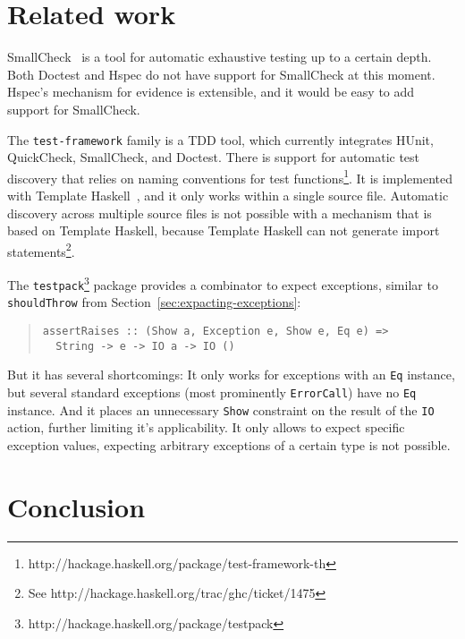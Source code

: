 \documentclass[preprint]{sigplanconf}
\begin{document}
\section{Related work}

SmallCheck~\cite{smallcheck} is a tool for
automatic exhaustive testing up to a certain depth.
Both Doctest and Hspec do not have support for SmallCheck
at this moment.
Hspec's mechanism for evidence is extensible, and it would be easy to
add support for SmallCheck.

The {\tt test-framework} family is a TDD tool, which currently
integrates HUnit, QuickCheck, SmallCheck, and Doctest.
There is support for automatic test discovery that relies on naming
conventions for test functions\footnote{%
http://hackage.haskell.org/package/test-framework-th}.  It is
implemented with Template Haskell~\cite{template-haskell}, and it only
works within a single source file.  Automatic discovery across
multiple source files is not possible with a mechanism that is based
on Template Haskell, because Template Haskell can not generate import
statements\footnote{%
See http://hackage.haskell.org/trac/ghc/ticket/1475 }.

The {\tt testpack}\footnote{%
http://hackage.haskell.org/package/testpack}
package provides a combinator to expect exceptions,
similar to {\tt shouldThrow} from
Section~\ref{sec:expacting-exceptions}:

\begin{quote}
\small
\begin{verbatim}
assertRaises :: (Show a, Exception e, Show e, Eq e) =>
  String -> e -> IO a -> IO ()
\end{verbatim}
\end{quote}

\noindent But it has several shortcomings:
It only works for exceptions with an {\tt Eq} instance,
but several standard exceptions (most
prominently {\tt ErrorCall}) have no {\tt Eq} instance.
And it places an unnecessary {\tt Show} constraint on the
result of the {\tt IO} action, further limiting it's applicability.
It only allows to expect specific exception values, expecting
arbitrary exceptions of a certain type is not possible.

\section{Conclusion}
\end{document}
